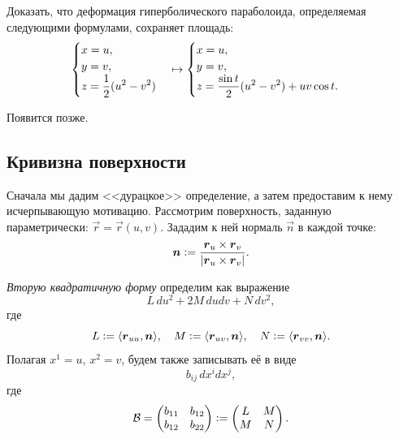 \begin{problem}
	Доказать, что деформация гиперболического параболоида, определяемая следующими формулами, сохраняет площадь:
	\[
		\begin{cases}
			x = u,\\
			y = v,\\
			\ds z = \frac{1}{2}(u^2 - v^2)
		\end{cases}
		\mapsto
		\begin{cases}
			x = u,\\
			y = v,\\
			\ds z = \frac{\sin t}{2}(u^2 - v^2) + uv\cos t.
		\end{cases}
	\]
\end{problem}

\begin{solution} %
	Появится позже.
\end{solution}


\subsection{Кривизна поверхности}

Сначала мы дадим <<дурацкое>> определение, а затем предоставим к нему исчерпывающую мотивацию. Рассмотрим поверхность, заданную параметрически: $\vec{r} = \vec{r}(u, v)$. Зададим к ней нормаль $\vec{n}$ в каждой точке:
\[
	\vec{n} \vcentcolon = \frac{\vec{r}_u \times \vec{r}_v}{\abs{\vec{r}_u \times \vec{r}_v}}.
\]

\begin{definition}
	\textit{Вторую квадратичную форму} определим как выражение
	\[
		L\,du^2 + 2M\,dudv + N\,dv^2,
	\]
	где
	\[
		L \vcentcolon = \langle\vec{r}_{uu}, \vec{n}\rangle,\quad M \vcentcolon = \langle\vec{r}_{uv}, \vec{n}\rangle,\quad N \vcentcolon = \langle\vec{r}_{vv}, \vec{n}\rangle.
	\]
	Полагая $x^1 = u$, $x^2 = v$, будем также записывать её в виде
	\[
		b_{ij}\,dx^idx^j,
	\]
	где
	\[
		\B = \begin{pmatrix}
			b_{11} & b_{12}\\
			b_{12} & b_{22}
		\end{pmatrix} \vcentcolon =
		\begin{pmatrix}
			L & M\\
			M & N
		\end{pmatrix}.
	\]
\end{definition}

